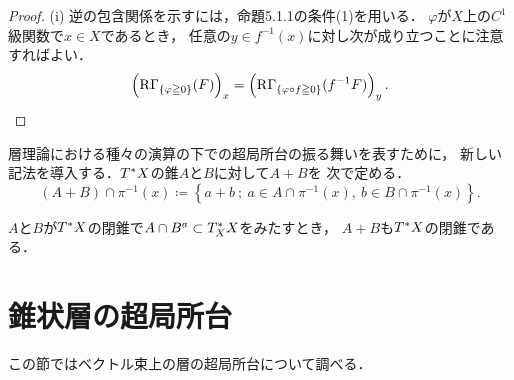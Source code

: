 \begin{proof}
    (i) 
    逆の包含関係を示すには，命題5.1.1の条件(1)を用いる．
    \(\varphi\)が\(X\)上の\(C^1\)級関数で\(x\in X\)であるとき，
    任意の\(y\in f^{-1}(x)\)に対し次が成り立つことに注意すればよい．
    \[
        \left(\RG_{\{\varphi\geqq0\}}(F)\right)_{x}
        =
        \left(\RG_{\{\varphi\circ f\geqq0\}}(f^{-1}F)\right)_{y}.
    \]
\end{proof}


層理論における種々の演算の下での超局所台の振る舞いを表すために，
新しい記法を導入する．\(\cotb[X]\)の錐\(A\)と\(B\)に対して\(A+B\)を
次で定める．
\begin{equation}
    (A+B)\cap\pi^{-1}(x)\coloneqq
    \left\{
        a+b~;~ 
        a\in A\cap \pi^{-1}(x),~ 
        b\in B\cap \pi^{-1}(x)
    \right\}.
\end{equation}

\begin{leftbar}
\begin{LMM}
    \(A\)と\(B\)が\(\cotb[X]\)の閉錐で\(
        A\cap B^{a}\subset \cotz[X]
    \)をみたすとき，
    \(A+B\)も\(\cotb[X]\)の閉錐である．
\end{LMM}
\end{leftbar}

\clearpage
\section{錐状層の超局所台}
\newcommand{\eu}{\mathbf{e}}
\newcommand{\rrp}{\rr^{+}}

この節ではベクトル束上の層の超局所台について調べる．

